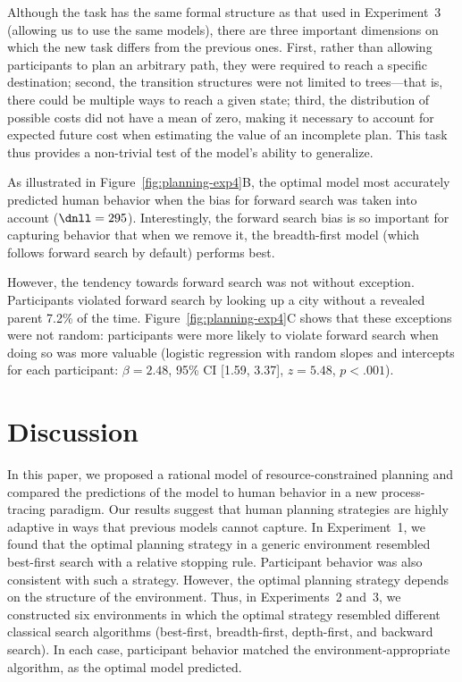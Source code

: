 Although the task has the same formal structure as that used in Experiment~3 (allowing us to use the same models), there are three important dimensions on which the new task differs from the previous ones. First, rather than allowing participants to plan an arbitrary path, they were required to reach a specific destination; second, the transition structures were not limited to trees---that is, there could be multiple ways to reach a given state; third, the distribution of possible costs did not have a mean of zero, making it necessary to account for expected future cost when estimating the value of an incomplete plan. This task thus provides a non-trivial test of the model's ability to generalize.

As illustrated in Figure~\ref{fig:planning-exp4}B, the optimal model most accurately predicted human behavior when the bias for forward search was taken into account ($\dnll = 295$). Interestingly, the forward search bias is so important for capturing behavior that when we remove it, the breadth-first model (which follows forward search by default) performs best. 

However, the tendency towards forward search was not without exception. Participants violated forward search by looking up a city without a revealed parent 7.2\% of the time. Figure~\ref{fig:planning-exp4}C shows that these exceptions were not random: participants were more likely to violate forward search when doing so was more valuable (logistic regression with random slopes and intercepts for each participant: $\beta = 2.48$, 95\% CI [1.59, 3.37], $z = 5.48$, $p < .001$).

\section{Discussion}\label{sec:planning-discussion}

In this paper, we proposed a rational model of resource-constrained planning and compared the predictions of the model to human behavior in a new process-tracing paradigm. Our results suggest that human planning strategies are highly adaptive in ways that previous models cannot capture. In Experiment~1, we found that the optimal planning strategy in a generic environment resembled best-first search with a relative stopping rule. Participant behavior was also consistent with such a strategy. However, the optimal planning strategy depends on the structure of the environment. Thus, in Experiments~2 and~3, we constructed six environments in which the optimal strategy resembled different classical search algorithms (best-first, breadth-first, depth-first, and backward search). In each case, participant behavior matched the environment-appropriate algorithm, as the optimal model predicted.

